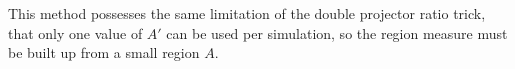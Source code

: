 \documentclass[prb,aps,twocolumn,floatfix,amsmath,amssymb,superscriptaddress,tightenlines]{revtex4}
\begin{document}
This method possesses the same limitation of the double projector ratio trick, that only one value of $A'$ can be used per simulation, so the region measure must be built up from a small region $A$.


\end{document}
